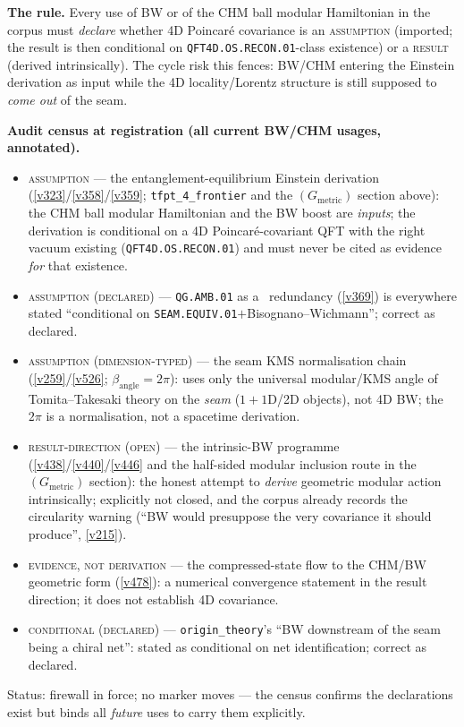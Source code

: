 \documentclass[11pt,a4paper]{article}
\begin{document}
\par\smallskip\noindent\textbf{The rule.}  Every use of BW or of the CHM ball modular
Hamiltonian in the corpus must \emph{declare} whether 4D Poincar\'e covariance is an
\textsc{assumption} (imported; the result is then conditional on
\texttt{QFT4D.OS.RECON.01}-class existence) or a \textsc{result} (derived intrinsically).  The
cycle risk this fences: BW/CHM entering the Einstein derivation as input while the 4D
locality/Lorentz structure is still supposed to \emph{come out} of the seam.

\par\smallskip\noindent\textbf{Audit census at registration (all current BW/CHM usages,
annotated).}
\begin{itemize}
\item \textsc{assumption} --- the entanglement-equilibrium Einstein derivation
  (\vref{v323}/\vref{v358}/\vref{v359}; \texttt{tfpt\_4\_frontier} and the $(G_{\mathrm{metric}})$
  section above): the CHM ball modular Hamiltonian and the BW boost are \emph{inputs}; the
  derivation is conditional on a 4D Poincar\'e-covariant QFT with the right vacuum existing
  (\texttt{QFT4D.OS.RECON.01}) and must never be cited as evidence \emph{for} that existence.
\item \textsc{assumption (declared)} --- \texttt{QG.AMB.01} as a \mC\ redundancy (\vref{v369})
  is everywhere stated ``conditional on \texttt{SEAM.EQUIV.01}$+$Bisognano--Wichmann''; correct
  as declared.
\item \textsc{assumption (dimension-typed)} --- the seam KMS normalisation chain
  (\vref{v259}/\vref{v526}; $\beta_{\mathrm{angle}}=2\pi$): uses only the universal modular/KMS
  angle of Tomita--Takesaki theory on the \emph{seam} ($1{+}1$D/2D objects), not 4D BW; the
  $2\pi$ is a normalisation, not a spacetime derivation.
\item \textsc{result-direction (open)} --- the intrinsic-BW programme
  (\vref{v438}/\vref{v440}/\vref{v446} and the half-sided modular inclusion route in the
  $(G_{\mathrm{metric}})$ section): the honest attempt to \emph{derive} geometric modular action
  intrinsically; explicitly not closed, and the corpus already records the circularity warning
  (``BW would presuppose the very covariance it should produce'', \vref{v215}).
\item \textsc{evidence, not derivation} --- the compressed-state flow to the CHM/BW geometric
  form (\vref{v478}): a numerical convergence statement in the result direction; it does not
  establish 4D covariance.
\item \textsc{conditional (declared)} --- \texttt{origin\_theory}'s ``BW downstream of the seam
  being a chiral net'': stated as conditional on net identification; correct as declared.
\end{itemize}
Status: firewall in force; no marker moves --- the census confirms the declarations exist but
binds all \emph{future} uses to carry them explicitly.
\end{document}
